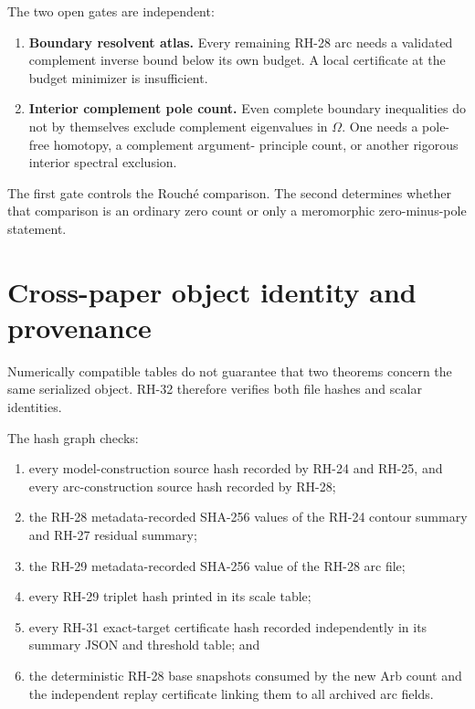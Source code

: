 \documentclass[11pt]{article}
\theoremstyle{definition}
\theoremstyle{remark}
\begin{document}
The two open gates are independent:

\begin{enumerate}
 \item \textbf{Boundary resolvent atlas.}  Every remaining RH-28 arc needs
       a validated complement inverse bound below its own budget.  A local
       certificate at the budget minimizer is insufficient.
 \item \textbf{Interior complement pole count.}  Even complete boundary
       inequalities do not by themselves exclude complement eigenvalues in
       $\Omega$.  One needs a pole-free homotopy, a complement argument-
       principle count, or another rigorous interior spectral exclusion.
\end{enumerate}

The first gate controls the Rouch\'e comparison.  The second determines
whether that comparison is an ordinary zero count or only a meromorphic
zero-minus-pole statement.


\section{Cross-paper object identity and provenance}
\label{sec:provenance}

Numerically compatible tables do not guarantee that two theorems concern
the same serialized object.  RH-32 therefore verifies both file hashes and
scalar identities.

The hash graph checks:

\begin{enumerate}
 \item every model-construction source hash recorded by RH-24 and RH-25,
       and every arc-construction source hash recorded by RH-28;
 \item the RH-28 metadata-recorded SHA-256 values of the RH-24 contour
       summary and RH-27 residual summary;
 \item the RH-29 metadata-recorded SHA-256 value of the RH-28 arc file;
 \item every RH-29 triplet hash printed in its scale table;
 \item every RH-31 exact-target certificate hash recorded independently in
       its summary JSON and threshold table; and
 \item the deterministic RH-28 base snapshots consumed by the new Arb count
       and the independent replay certificate linking them to all archived
       arc fields.
\end{enumerate}
\end{document}
